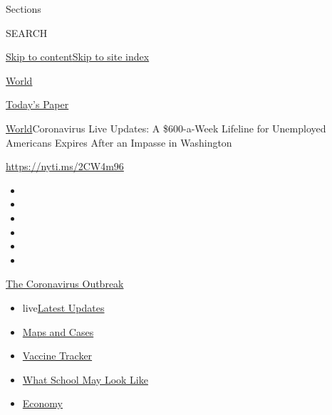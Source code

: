 Sections

SEARCH

\protect\hyperlink{site-content}{Skip to
content}\protect\hyperlink{site-index}{Skip to site index}

\href{https://www.nytimes3xbfgragh.onion/section/world}{World}

\href{https://myaccount.nytimes3xbfgragh.onion/auth/login?response_type=cookie\&client_id=vi}{}

\href{https://www.nytimes3xbfgragh.onion/section/todayspaper}{Today's
Paper}

\href{/section/world}{World}\textbar{}Coronavirus Live Updates: A
\$600-a-Week Lifeline for Unemployed Americans Expires After an Impasse
in Washington

\url{https://nyti.ms/2CW4m96}

\begin{itemize}
\item
\item
\item
\item
\item
\item
\end{itemize}

\href{https://www.nytimes3xbfgragh.onion/news-event/coronavirus?action=click\&pgtype=Article\&state=default\&region=TOP_BANNER\&context=storylines_menu}{The
Coronavirus Outbreak}

\begin{itemize}
\tightlist
\item
  live\href{https://www.nytimes3xbfgragh.onion/2020/07/31/world/coronavirus-covid-19.html?action=click\&pgtype=Article\&state=default\&region=TOP_BANNER\&context=storylines_menu}{Latest
  Updates}
\item
  \href{https://www.nytimes3xbfgragh.onion/interactive/2020/us/coronavirus-us-cases.html?action=click\&pgtype=Article\&state=default\&region=TOP_BANNER\&context=storylines_menu}{Maps
  and Cases}
\item
  \href{https://www.nytimes3xbfgragh.onion/interactive/2020/science/coronavirus-vaccine-tracker.html?action=click\&pgtype=Article\&state=default\&region=TOP_BANNER\&context=storylines_menu}{Vaccine
  Tracker}
\item
  \href{https://www.nytimes3xbfgragh.onion/interactive/2020/07/29/us/schools-reopening-coronavirus.html?action=click\&pgtype=Article\&state=default\&region=TOP_BANNER\&context=storylines_menu}{What
  School May Look Like}
\item
  \href{https://www.nytimes3xbfgragh.onion/live/2020/07/31/business/stock-market-today-coronavirus?action=click\&pgtype=Article\&state=default\&region=TOP_BANNER\&context=storylines_menu}{Economy}
\end{itemize}

